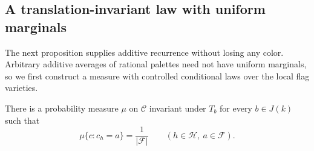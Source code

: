 \subsection{A translation-invariant law with uniform marginals}

The next proposition supplies additive recurrence without losing any
color. Arbitrary additive averages of rational palettes need not have
uniform marginals, so we first construct a measure with controlled
conditional laws over the local flag varieties.

\begin{proposition}\label{prop:palette-measure}
There is a probability measure $\mu$ on $\mathcal C$ invariant under
$T_b$ for every $b\in J(k)$ such that
\[
 \mu\{c:c_h=a\}=\frac1{|\mathcal F|}
 \qquad(h\in\mathcal H,\ a\in\mathcal F).
\]
\end{proposition}

